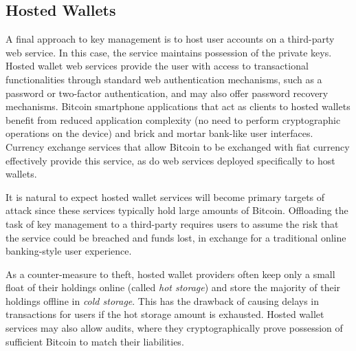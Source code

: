 \subsection{Hosted Wallets} 
A final approach to key management is to host user accounts on a third-party web service. In this case, the service maintains possession of the private keys. Hosted wallet web services provide the user with access to transactional functionalities through standard web authentication mechanisms, such as a password or two-factor authentication, and may also offer password recovery mechanisms. Bitcoin smartphone applications that act as clients to hosted wallets benefit from reduced application complexity (\ie no need to perform cryptographic operations on the device) and brick and mortar bank-like user interfaces. Currency exchange services that allow Bitcoin to be exchanged with fiat currency effectively provide this service, as do web services deployed specifically to host wallets.


It is natural to expect hosted wallet services will become primary targets of attack since these services typically hold large amounts of Bitcoin. Offloading the task of key management to a third-party requires users to assume the risk that the service could be breached and funds lost, in exchange for a traditional online banking-style user experience. 

As a counter-measure to theft, hosted wallet providers often keep only a small float of their holdings online (called \textit{hot storage}) and store the majority of their holdings offline in \textit{cold storage}. This has the drawback of causing delays in transactions for users if the hot storage amount is exhausted.
Hosted wallet services may also allow audits, where they cryptographically prove possession of sufficient Bitcoin to match their liabilities.  


